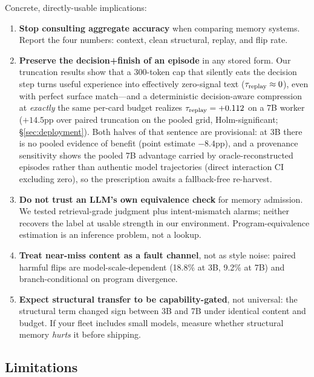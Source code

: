 Concrete, directly-usable implications:
\begin{enumerate}[leftmargin=1.8em]
  \item \textbf{Stop consulting aggregate accuracy} when comparing memory systems. Report the four numbers: context, clean structural, replay, and flip rate.
  \item \textbf{Preserve the decision+finish of an episode} in any stored form. Our truncation results show that a 300-token cap that silently eats the decision step turns useful experience into effectively zero-signal text ($\tau_{\mathrm{replay}} \approx 0$), even with perfect surface match---and a deterministic decision-aware compression at \emph{exactly} the same per-card budget realizes $\tau_{\mathrm{replay}}=+0.112$ on a 7B worker ($+14.5$pp over paired truncation on the pooled grid, Holm-significant; \S\ref{sec:deployment}). Both halves of that sentence are provisional: at 3B there is no pooled evidence of benefit (point estimate $-8.4$pp), and a provenance sensitivity shows the pooled 7B advantage carried by oracle-reconstructed episodes rather than authentic model trajectories (direct interaction CI excluding zero), so the prescription awaits a fallback-free re-harvest.
  \item \textbf{Do not trust an LLM's own equivalence check} for memory admission. We tested retrieval-grade judgment plus intent-mismatch alarms; neither recovers the label at usable strength in our environment. Program-equivalence estimation is an inference problem, not a lookup.
  \item \textbf{Treat near-miss content as a fault channel}, not as style noise: paired harmful flips are model-scale-dependent (18.8\% at 3B, 9.2\% at 7B) and branch-conditional on program divergence.
  \item \textbf{Expect structural transfer to be capability-gated}, not universal: the structural term changed sign between 3B and 7B under identical content and budget. If your fleet includes small models, measure whether structural memory \emph{hurts} it before shipping.
\end{enumerate}

\subsection{Limitations}

